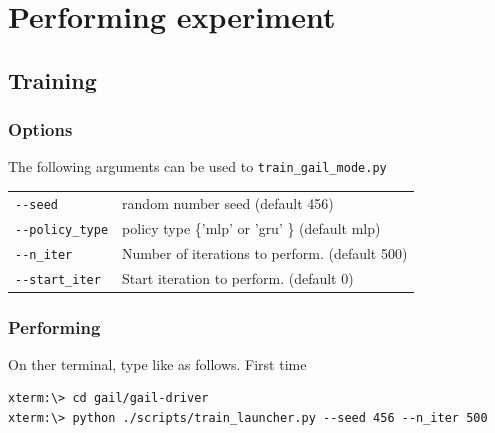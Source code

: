\documentclass[openany,11pt]{report}%
\begin{document}
\chapter{Performing experiment}

\section{Training}

\subsection{Options}

The following arguments can be used to {\tt train\_gail\_mode.py}


\begin{tabular}{|p{4cm}|p{10cm}|} \hline
{\tt -\hspace{0.1mm}-seed} & random number seed (default 456) \\
{\tt -\hspace{0.1mm}-policy\_type} & policy type \{'mlp' or 'gru' \} (default mlp) \\
{\tt -\hspace{0.1mm}-n\_iter} & Number of iterations to perform. (default 500) \\
{\tt -\hspace{0.1mm}-start\_iter} & Start iteration to perform. (default 0) \\
\hline
\end{tabular}

\subsection{Performing}

On ther terminal, type like as follows.
First time 

\begin{lstlisting}[style=DOS]
xterm:\> cd gail/gail-driver
xterm:\> python ./scripts/train_launcher.py --seed 456 --n_iter 500 
\end{lstlisting}
\end{document}
